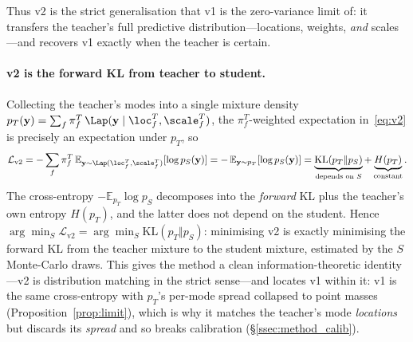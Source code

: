 Thus v2 is the strict generalisation that v1 is the zero-variance limit of: it
transfers the teacher's full predictive distribution---locations, weights,
\emph{and} scales---and recovers v1 exactly when the teacher is certain.

\paragraph{v2 is the forward KL from teacher to student.} Collecting the teacher's
modes into a single mixture density
$p_T(\mathbf{y})=\sum_f \pi^T_f\,\Lap(\mathbf{y}\mid\loc^T_f,\scale^T_f)$, the
$\pi^T_f$-weighted expectation in~\eqref{eq:v2} is precisely an expectation under
$p_T$, so
\begin{equation}
  \label{eq:v2kl}
  \mathcal{L}_{\mathrm{v2}}
    = -\sum_{f} \pi^T_f\,
       \mathbb{E}_{\mathbf{y}\sim\Lap(\loc^T_f,\scale^T_f)}\!\left[\log p_S(\mathbf{y})\right]
    = -\,\mathbb{E}_{\mathbf{y}\sim p_T}\!\left[\log p_S(\mathbf{y})\right]
    = \underbrace{\mathrm{KL}\!\left(p_T \Vert p_S\right)}_{\text{depends on }S}
      + \underbrace{H(p_T)}_{\text{constant}} .
\end{equation}
The cross-entropy $-\mathbb{E}_{p_T}\!\log p_S$ decomposes into the \emph{forward}
KL plus the teacher's own entropy $H(p_T)$, and the latter does not depend on the
student. Hence $\arg\min_S \mathcal{L}_{\mathrm{v2}} = \arg\min_S
\mathrm{KL}(p_T\Vert p_S)$: minimising v2 is exactly minimising the forward KL from
the teacher mixture to the student mixture, estimated by the $S$ Monte-Carlo draws.
This gives the method a clean information-theoretic identity---v2 is
distribution matching in the strict sense---and locates v1 within it: v1 is the
same cross-entropy with $p_T$'s per-mode spread collapsed to point masses
(Proposition~\ref{prop:limit}), which is why it matches the teacher's mode
\emph{locations} but discards its \emph{spread} and so breaks calibration
(\S\ref{ssec:method_calib}).

